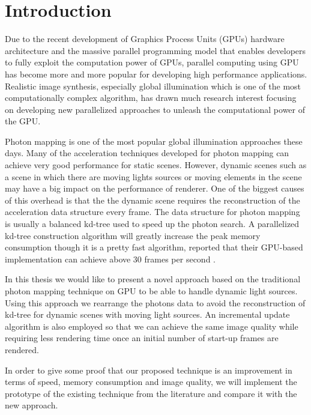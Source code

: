 \chapter{Introduction}

Due to the recent development of Graphics Process Units (GPUs) hardware architecture and the massive parallel programming model that enables developers to fully exploit the computation power of GPUs, parallel computing using GPU has become more and more popular for developing high performance applications. Realistic image synthesis, especially global illumination which is one of the most computationally complex algorithm, has drawn much research interest focusing on developing new parallelized approaches to unleash the computational power of the GPU.

Photon mapping is one of the most popular global illumination approaches these days. Many of the acceleration techniques developed for photon mapping can achieve very good performance for static scenes. However, dynamic scenes such as a scene in which there are moving lights sources or moving elements in the scene may have a big impact on the performance of renderer. One of the biggest causes of this overhead is that the the dynamic scene requires the reconstruction of the acceleration data structure every frame. The data structure for photon mapping is usually a balanced kd-tree \cite{Bentley:1975:MBS:361002.361007} used to speed up the photon search. A parallelized kd-tree construction algorithm will greatly increase the peak memory consumption though it is a pretty fast algorithm, \citeauthor{Zhou2008} reported that their GPU-based implementation can achieve above 30 frames per second \cite{Zhou2008}.

In this thesis we would like to present a novel approach based on the traditional photon mapping technique on GPU to be able to handle dynamic light sources. Using this approach we rearrange the photons data to avoid the reconstruction of kd-tree for dynamic scenes with moving light sources. An incremental update algorithm is also employed so that we can achieve the same image quality while requiring less rendering time once an initial
number of start-up frames are rendered.

In order to give some proof that our proposed technique is an improvement in terms of speed, memory consumption and image quality, we will implement the prototype of the existing technique from the literature and compare it with the new approach.


